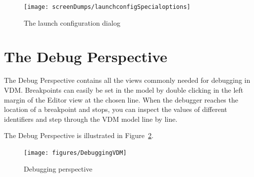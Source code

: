 \documentclass{overturerepchap}
\begin{document}
\begin{figure}[htp]
\begin{center}
  \texttt{[image: screenDumps/launchconfigSpecialoptions]}
  \caption{The launch configuration dialog}
  \label{fig:userguide:launchconfigSpecialoptions}
\end{center}
\end{figure}

\section{The Debug Perspective}

The Debug Perspective contains all the views
commonly needed for debugging in VDM. Breakpoints can easily be set in the
model by double clicking in the left margin of the Editor view at the chosen
line. When the debugger reaches the location of a breakpoint and stops, you can
inspect the values of different identifiers and step through the VDM model
line by line.

The Debug Perspective is illustrated in Figure~\ref{fig:userguide:DebuggingVDM}.

\begin{figure}[htp]
\begin{center}
  \texttt{[image: figures/DebuggingVDM]}
  \caption[Debugging perspective]{Debugging perspective}
  \label{fig:userguide:DebuggingVDM}
\end{center}
\end{figure}

\end{document}
